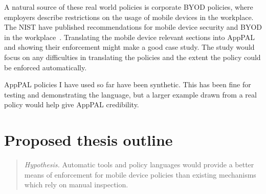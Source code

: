 \documentclass[a4paper]{scrartcl}
\begin{document}
A natural source of these real world policies is corporate \ac{BYOD} policies, where employers describe restrictions on the usage of mobile devices in the workplace.
The \ac{NIST} have published recommendations for mobile device security and \ac{BYOD} in the workplace~\citep{Souppaya:2013jf,Scarfone:2009vy}.
Translating the mobile device relevant sections into AppPAL and showing their enforcement might make a good case study.
The study would focus on any difficulties in translating the policies and the extent the policy could be enforced automatically.

AppPAL policies I have used so far have been synthetic.
This has been fine for testing and demonstrating the language, but a larger example drawn from a real policy would help give AppPAL credibility.


\section{Proposed thesis outline}

\begin{quote}
  \emph{Hypothesis.} Automatic tools and policy languages would provide a
  better means of enforcement for mobile device policies than existing
  mechanisms which rely on manual inspection.
\end{quote}
\end{document}
